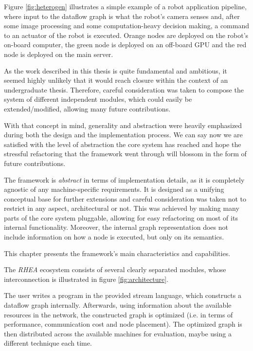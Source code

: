 \documentclass{dithesis}
\begin{document}
Figure \ref{fig:heterogen} illustrates a simple example of a robot application pipeline, where input to the dataflow graph is what the robot's camera senses and, after some image processing and some computation-heavy decision making, a command to an actuator of the robot is executed. Orange nodes are deployed on the robot's on-board computer, the green node is deployed on an off-board GPU and the red node is deployed on the main server.



As the work described in this thesis is quite fundamental and ambitious, it seemed highly unlikely that it would reach closure within the context of an undergraduate thesis. Therefore, careful consideration was taken to compose the system of different independent modules, which could easily be extended/modified, allowing many future contributions.

With that concept in mind, generality and abstraction were heavily emphasized during both the design and the implementation process. We can say now we are satisfied with the level of abstraction the core system has reached and hope the stressful refactoring that the framework went through will blossom in the form of future contributions.


The framework is \textit{abstract} in terms of implementation details, as it is completely agnostic of any machine-specific requirements. It is designed as a unifying conceptual base for further extensions and careful consideration was taken not to restrict in any aspect, architectural or not. This was achieved by making many parts of the core system pluggable, allowing for easy refactoring on most of its internal functionality. Moreover, the internal graph representation does not include information on how a node is executed, but only on its semantics.

This chapter presents the framework's main characteristics and capabilities.

The \textit{RHEA} ecosystem consists of several clearly separated modules, whose interconnection is illustrated in figure \ref{fig:architecture}.


The user writes a program in the provided stream language, which constructs a dataflow graph internally. Afterwards, using information about the available resources in the network, the constructed graph is optimized (i.e. in terms of performance, communication cost and node placement). The optimized graph is then distributed across the available machines for evaluation, maybe using a different technique each time.
\end{document}
